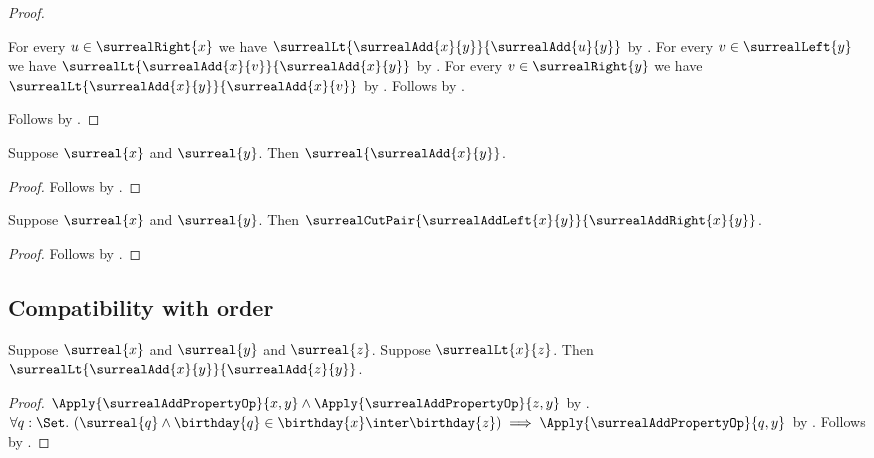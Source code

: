 \begin{proof}
\begin{subproof}
        For every $u\in\surrealRight{x}$ we have
            $\surrealLt{\surrealAdd{x}{y}}{\surrealAdd{u}{y}}$
            by .
        For every $v\in\surrealLeft{y}$ we have
            $\surrealLt{\surrealAdd{x}{v}}{\surrealAdd{x}{y}}$
            by .
        For every $v\in\surrealRight{y}$ we have
            $\surrealLt{\surrealAdd{x}{y}}{\surrealAdd{x}{v}}$
            by .
        Follows by .
    \end{subproof}
    Follows by .
\end{proof}

\begin{corollary}\label{surreal_add_is_surreal}
    Suppose $\surreal{x}$ and $\surreal{y}$.
    Then $\surreal{\surrealAdd{x}{y}}$.
\end{corollary}
\begin{proof}
    Follows by .
\end{proof}

\begin{corollary}\label{surreal_add_cut_pair}
    Suppose $\surreal{x}$ and $\surreal{y}$.
    Then $\surrealCutPair{\surrealAddLeft{x}{y}}
        {\surrealAddRight{x}{y}}$.
\end{corollary}
\begin{proof}
    Follows by .
\end{proof}

\subsection{Compatibility with order}

\begin{theorem}\label{surreal_add_lt_left}
    Suppose $\surreal{x}$ and $\surreal{y}$ and $\surreal{z}$.
    Suppose $\surrealLt{x}{z}$.
    Then $\surrealLt{\surrealAdd{x}{y}}{\surrealAdd{z}{y}}$.
\end{theorem}
\begin{proof}
    $\Apply{\surrealAddPropertyOp}{x,y}\land
        \Apply{\surrealAddPropertyOp}{z,y}$
        by .
    $\forall q:\Set.\ (\surreal{q}\land
        \birthday{q}\in\birthday{x}\inter\birthday{z})\implies
        \Apply{\surrealAddPropertyOp}{q,y}$
        by .
    Follows by .
\end{proof}


